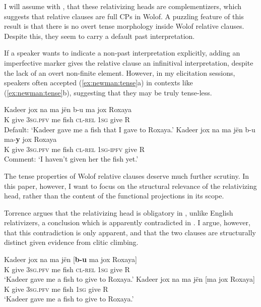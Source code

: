 \documentclass[output=paper]{langscibook}
\begin{document}
I will assume with \citet{torrence:2013}, that these relativizing heads are complementizers, which suggests that relative clauses are full CPs in Wolof. A puzzling feature of this result is that there is no overt tense morphology inside Wolof relative clauses. Despite this, they seem to carry a default past interpretation.

If a speaker wants to indicate a non-past interpretation explicitly, adding an imperfective marker gives the relative clause an infinitival interpretation, despite the lack of an overt non-finite element. However, in my elicitation sessions, speakers often accepted (\ref{ex:newman:tense}a) in contexts like (\ref{ex:newman:tense}b), suggesting that they may be truly tense-less. 

\begin{exe}
    \ex \label{ex:newman:tense} \begin{xlist}
        \ex 
        \gll Kadeer jox na ma j\"en b-u ma jox Roxaya\\
        K give \textsc{3sg.pfv} me fish \textsc{cl-rel} \textsc{1sg} give R\\
        \glt Default: `Kadeer gave me a fish that I gave to Roxaya.'
        \ex 
        \gll Kadeer jox na ma j\"en b-u ma-\textbf{y} jox Roxaya\\
        K give \textsc{3sg.pfv} me fish \textsc{cl-rel} \textsc{1sg-ipfv} give R\\
        \glt Comment: `I haven't given her the fish yet.'
    \end{xlist}
\end{exe}

The tense properties of Wolof relative clauses deserve much further scrutiny. In this paper, however, I want to focus on the structural relevance of the relativizing head, rather than the content of the functional projections in its scope. 

Torrence argues that the relativizing head is obligatory in , unlike English relativizers, a conclusion which is apparently contradicted in . I argue, however, that this contradiction is only apparent, and that the two clauses are structurally distinct given evidence from clitic climbing.

\begin{exe}
	 \begin{xlist}
		\ex 
		\gll Kadeer jox na ma j\"en [\textbf{b-u} ma jox Roxaya] \\
		K give \textsc{3sg.pfv} me fish \textsc{cl-rel} \textsc{1sg} give R \\
		\trans `Kadeer gave me a fish to give to Roxaya.'
		\ex 
		\gll Kadeer jox na ma j\"en [ma jox Roxaya] \\
		K give \textsc{3sg.pfv} me fish \textsc{1sg} give R \\
		\trans `Kadeer gave me a fish to give to Roxaya.'
	\end{xlist}
\end{exe}
\end{document}
